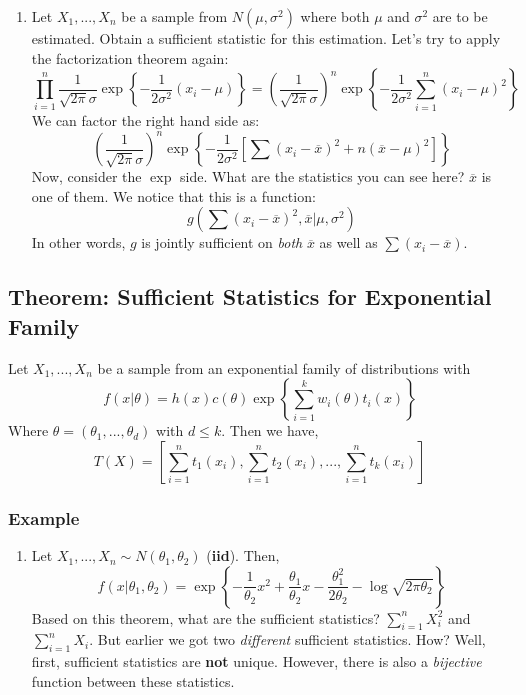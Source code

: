 \documentclass{article}
\begin{document}
\begin{enumerate}
    \item Let $X_1,...,X_n$ be a sample from $N(\mu,\sigma^2)$ where both $\mu$ and $\sigma^2$ are to be estimated. Obtain a sufficient statistic for this estimation. Let's try to apply the factorization theorem again:
    \begin{equation*}
        \prod_{i=1}^n \frac{1}{\sqrt{2\pi}\sigma} \exp\left\{ -\frac{1}{2\sigma^2}(x_i-\mu) \right\} = \left(\frac{1}{\sqrt{2\pi}\sigma} \right)^n \exp\left\{-\frac{1}{2\sigma^2} \sum_{i=1}^n (x_i-\mu)^2 \right\}
    \end{equation*}
    We can factor the right hand side as:
    \begin{equation*}
        \left(\frac{1}{\sqrt{2\pi}\sigma} \right)^n \exp\left\{-\frac{1}{2\sigma^2}\left[\sum (x_i - \overline{x})^2 + n(\overline{x}-\mu)^2 \right] \right\}
    \end{equation*}
    Now, consider the $\exp$ side. What are the statistics you can see here? $\overline{x}$ is one of them. We notice that this is a function:
    \begin{equation*}
        g\left(\sum (x_i-\overline{x})^2,\overline{x} | \mu,\sigma^2 \right)
    \end{equation*}
    In other words, $g$ is jointly sufficient on \textit{both} $\overline{x}$ as well as $\sum (x_i-\overline{x})$.
\end{enumerate}

\subsection{Theorem: Sufficient Statistics for Exponential Family}
Let $X_1,...,X_n$ be a sample from an exponential family of distributions with
\begin{equation*}
    f(x|\theta) = h(x) c(\theta) \exp\left\{ \sum_{i=1}^k w_i(\theta) t_i(x) \right\}
\end{equation*}
Where $\theta = (\theta_1,...,\theta_d)$ with $d \leq k$. Then we have,
\begin{equation*}
    T(X) = \left[\sum_{i=1}^n t_1(x_i), \sum_{i=1}^n t_2(x_i),...,\sum_{i=1}^n t_k(x_i) \right]
\end{equation*}

\subsubsection*{Example}
\begin{enumerate}
    \item Let $X_1,...,X_n \sim N(\theta_1,\theta_2)$ (\textbf{iid}). Then,
    \begin{equation*}
        f(x|\theta_1,\theta_2) = \exp \left\{ -\frac{1}{\theta_2}x^2 + \frac{\theta_1}{\theta_2}x - \frac{\theta_1^2}{2\theta_2} - \log \sqrt{2\pi\theta_2} \right\}
    \end{equation*}
    Based on this theorem, what are the sufficient statistics? $\sum_{i=1}^n X_i^2$ and $\sum_{i=1}^n X_i$. But earlier we got two \textit{different} sufficient statistics. How? Well, first, sufficient statistics are \textbf{not} unique. However, there is also a \textit{bijective} function between these statistics.
\end{enumerate}
\end{document}
